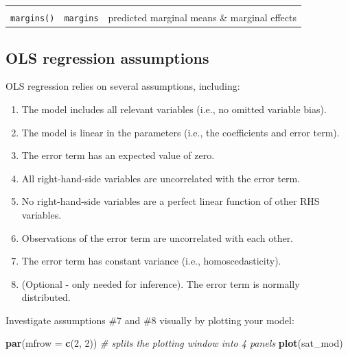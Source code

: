 \documentclass[]{book}
\newenvironment{Shaded}{\begin{snugshade}}{\end{snugshade}}
\newcommand{\KeywordTok}[1]{\textcolor[rgb]{0.13,0.29,0.53}{\textbf{#1}}}
\newcommand{\DataTypeTok}[1]{\textcolor[rgb]{0.13,0.29,0.53}{#1}}
\newcommand{\DecValTok}[1]{\textcolor[rgb]{0.00,0.00,0.81}{#1}}
\newcommand{\CommentTok}[1]{\textcolor[rgb]{0.56,0.35,0.01}{\textit{#1}}}
\newcommand{\NormalTok}[1]{#1}
\providecommand{\tightlist}{%
  \setlength{\itemsep}{0pt}\setlength{\parskip}{0pt}}
\begin{document}
\begin{longtable}[]{@{}lll@{}}
\begin{minipage}[t]{0.58\columnwidth}
\end{minipage}\tabularnewline
\begin{minipage}[t]{0.16\columnwidth}\raggedright\strut
\texttt{margins()}\strut
\end{minipage} & \begin{minipage}[t]{0.17\columnwidth}\raggedright\strut
\texttt{margins}\strut
\end{minipage} & \begin{minipage}[t]{0.58\columnwidth}\raggedright\strut
predicted marginal means \& marginal effects\strut
\end{minipage}\tabularnewline
\bottomrule
\end{longtable}

\subsection{OLS regression
assumptions}\label{ols-regression-assumptions}

OLS regression relies on several assumptions, including:

\begin{enumerate}
\def\labelenumi{\arabic{enumi}.}
\tightlist
\item
  The model includes all relevant variables (i.e., no omitted variable
  bias).
\item
  The model is linear in the parameters (i.e., the coefficients and
  error term).
\item
  The error term has an expected value of zero.
\item
  All right-hand-side variables are uncorrelated with the error term.
\item
  No right-hand-side variables are a perfect linear function of other
  RHS variables.
\item
  Observations of the error term are uncorrelated with each other.
\item
  The error term has constant variance (i.e., homoscedasticity).
\item
  (Optional - only needed for inference). The error term is normally
  distributed.
\end{enumerate}

Investigate assumptions \#7 and \#8 visually by plotting your model:

\begin{Shaded}
\begin{Highlighting}[]
  \KeywordTok{par}\NormalTok{(}\DataTypeTok{mfrow =} \KeywordTok{c}\NormalTok{(}\DecValTok{2}\NormalTok{, }\DecValTok{2}\NormalTok{)) }\CommentTok{# splits the plotting window into 4 panels}
  \KeywordTok{plot}\NormalTok{(sat_mod)}
\end{Highlighting}
\end{Shaded}
\end{document}
